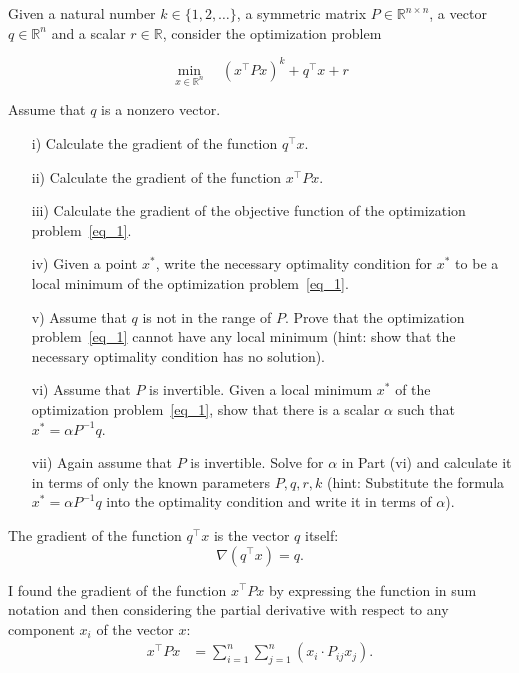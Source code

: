 \begin{homeworkProblem}
    
Given a natural number $k \in \{1, 2, \ldots\}$, a symmetric matrix $P\in\mathbb R^{n\times n}$,
a vector $q\in\mathbb R^n$ and a scalar $r\in\mathbb R$, consider the optimization problem

    \begin{equation}
        \label{eq_1}
        \min_{x\in\mathbb R^n} \quad (x^\top P x)^k + q^\top x + r 
    \end{equation}
    
    Assume that $q$ is a nonzero vector. 
    \begin{itemize}
        \item [i)] Calculate the gradient of the function $q^\top x$.
        \item [ii)] Calculate the gradient of the function $x^\top P x$.
        \item [iii)] Calculate the gradient of the objective function of the 
                    optimization problem~\eqref{eq_1}.
        \item [iv)] Given a point $x^*$, write the necessary optimality condition 
                    for $x^*$ to be a local minimum of the optimization problem~\eqref{eq_1}.
        \item [v)] Assume that $q$ is not in the range of $P$. Prove that the 
                    optimization problem~\eqref{eq_1} cannot have any local minimum 
                    (hint: show that the necessary optimality condition has no solution).
        \item [vi)] Assume that $P$ is invertible. Given a  local minimum $x^*$ of 
                    the optimization problem~\eqref{eq_1}, show that there is a 
                    scalar $\alpha$ such that $x^*=\alpha P^{-1}q$. 
        \item [vii)] Again assume that $P$ is invertible. Solve for $\alpha$ in Part 
                    (vi) and calculate it in terms of only the known parameters $P,q,
                    r,k$ (hint: Substitute the formula $x^*=\alpha P^{-1}q$ into the 
                    optimality condition and write it in terms of $\alpha$). 
    \end{itemize}

    \begin{solution}
        The gradient of the function $q^\top x$ is the vector $q$ itself:
        \[
            \nabla (q^\top x) = q.
        \]

        I found the gradient of the function $x^\top P x$ by expressing the function
        in sum notation and then considering the partial derivative with respect to
        any component $x_i$ of the vector $x$:
        \begin{align*}
            x^\top P x &= \sum_{i=1}^n \sum_{j=1}^n \left( x_i \cdot P_{ij} x_j \right).
        \end{align*}


\end{solution}
\end{homeworkProblem}
